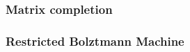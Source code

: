 \documentclass[bj, preprint]{imsart}
\begin{document}
\subsubsection{Matrix completion}\label{subsubsec:method.impl.svd}

\subsubsection{Restricted Bolztmann Machine}\label{subsubsec:method.impl.rbm}








\end{document}
